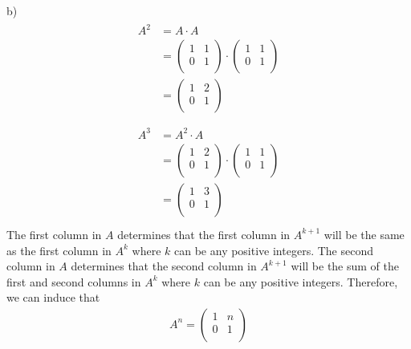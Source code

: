 \documentclass{article}
\begin{document}
b)
\begin{gather*}
  \begin{split}
    A^2 &= A \cdot A \\
        &= \begin{pmatrix}
             1 & 1 \\
             0 & 1 \\ 
           \end{pmatrix} \cdot
           \begin{pmatrix}
             1 & 1 \\
             0 & 1 \\
           \end{pmatrix} \\
        &= \begin{pmatrix}
             1 & 2 \\
             0 & 1 \\ 
           \end{pmatrix} \\
  \end{split} \\
  \begin{split}
    A^3 &= A^2 \cdot A \\
        &= \begin{pmatrix}
             1 & 2 \\
             0 & 1 \\ 
           \end{pmatrix} \cdot
           \begin{pmatrix}
             1 & 1 \\
             0 & 1 \\
           \end{pmatrix} \\
        &= \begin{pmatrix}
             1 & 3 \\
             0 & 1 \\ 
           \end{pmatrix}
  \end{split} \\
\end{gather*}
The first column in $A$ determines that the first column in $A^{k+1}$ will be 
the same as the first column in $A^k$ where $k$ can be any positive integers.
The second column in $A$ determines that the second column in $A^{k+1}$ will be 
the sum of the first and second columns in $A^k$ where $k$ can be any positive 
integers. Therefore, we can induce that
\begin{gather*}
  A^n = \begin{pmatrix}
          1 & n \\
          0 & 1 \\ 
        \end{pmatrix} \\
\end{gather*}
\end{document}
